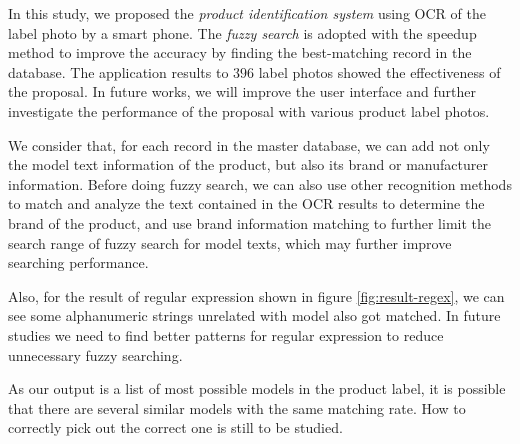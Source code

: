 \documentclass[technicalreport]{ieicej}
\begin{document}
    In this study, we proposed the {\em product identification system} using OCR of the label photo by a smart phone. The {\em fuzzy search} is adopted with the speedup method to improve the accuracy by finding the best-matching record in the database. The application results to $396$ label photos showed the effectiveness of the proposal. In future works, we will improve the user interface and further investigate the performance of the proposal with various product label photos.
            
    We consider that, for each record in the master database, we can add not only the model text information of the product, but also its brand or manufacturer information. Before doing fuzzy search, we can also use other recognition methods to match and analyze the text contained in the OCR results to determine the brand of the product, and use brand information matching to further limit the search range of fuzzy search for model texts, which may further improve searching performance.

    Also, for the result of regular expression shown in figure \ref{fig:result-regex}, we can see some alphanumeric strings unrelated with model also got matched. In future studies we need to find better patterns for regular expression to reduce unnecessary fuzzy searching.

    As our output is a list of most possible models in the product label, it is possible that there are several similar models with the same matching rate. How to correctly pick out the correct one is still to be studied.
\end{document}
